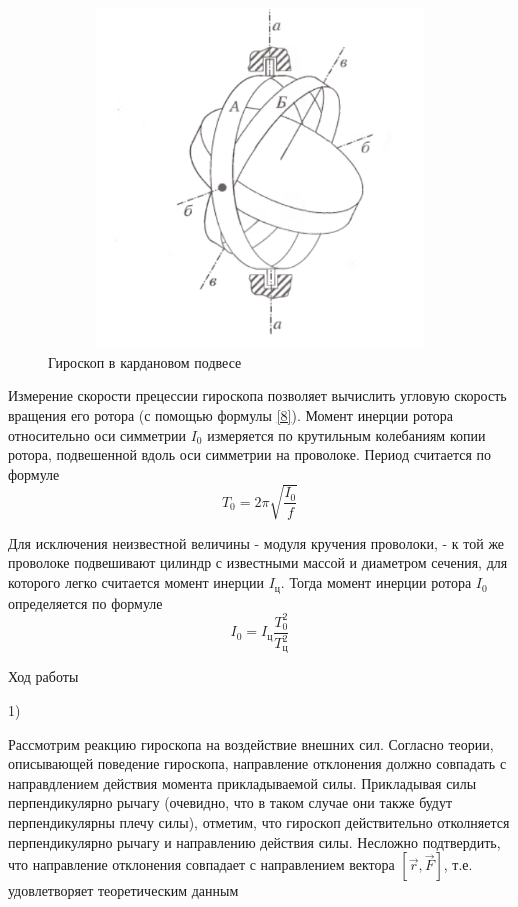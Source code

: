 \documentclass[12pt,a4paper]{article}
\begin{document}
\begin{figure}[H]
\centering
\includegraphics[width=12cm, height=9cm]{1.2.5_3}
\caption{Гироскоп в кардановом подвесе}
\label{рис.3}
\end{figure}
\par Измерение скорости прецессии гироскопа позволяет вычислить угловую скорость вращения его ротора (с помощью формулы \ref{8}). Момент инерции ротора относительно оси симметрии $I_{0}$ измеряется по крутильным колебаниям копии ротора, подвешенной вдоль оси симметрии на проволоке. Период считается по формуле 
\begin{equation}
T_{0}=2\pi\sqrt{\frac{I_{0}}{f}} \label{8}
\end{equation}
\par Для исключения неизвестной величины - модуля кручения проволоки, - к той же проволоке подвешивают цилиндр с известными массой и диаметром сечения, для которого легко считается момент инерции $I_{\text{ц}}$. Тогда момент инерции ротора $I_{0}$ определяется по формуле
\begin{equation}
I_{0}=I_{\text{ц}}\frac{T^2_{0}}{T^2_{ц}}
\end{equation} 
\newpage
\begin{center}
\large Ход работы
\end{center}
1) \par \large Рассмотрим реакцию гироскопа на воздействие внешних сил. Согласно теории, описывающей поведение гироскопа, направление отклонения должно совпадать с направдлением действия момента прикладываемой силы. Прикладывая силы перпендикулярно рычагу (очевидно, что в таком случае они также будут перпендикулярны плечу силы), отметим, что гироскоп действительно отколняется перпендикулярно рычагу и направлению действия силы. Несложно подтвердить, что направление отклонения совпадает с направлением вектора $[\vec{r},\vec{F}]$, т.е. удовлетворяет теоретическим данным \hfill \break
\end{document}
